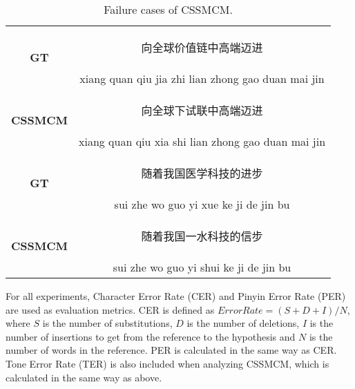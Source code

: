 \documentclass[sigconf]{acmart}
\begin{document}
\begin{table}[htp]
\small
\centering
\caption {Failure cases of CSSMCM.}
\label{table:text_failure}
\begin{tabular}{c | c }

\hline
\multirow{2}{*}{\textbf{GT}}     & \begin{CJK*}{UTF8}{gbsn}向全球价值链中高端迈进\end{CJK*} \\
                & xiang quan qiu jia zhi lian zhong gao duan mai jin    \\ \hline
\multirow{2}{*}{\textbf{CSSMCM}} & \begin{CJK*}{UTF8}{gbsn}向全球下试联中高端迈进\end{CJK*} \\
                & xiang quan qiu xia shi lian zhong gao duan mai jin   \\ \hline \hline
  
\multirow{2}{*}{\textbf{GT}}     & \begin{CJK*}{UTF8}{gbsn}随着我国医学科技的进步\end{CJK*}  \\
                & sui zhe wo guo yi xue ke ji de jin bu   \\ 
                \hline
\multirow{2}{*}{\textbf{CSSMCM}} & \begin{CJK*}{UTF8}{gbsn}随着我国一水科技的信步\end{CJK*}  \\
                & sui zhe wo guo yi shui ke ji de jin bu   \\ 
\hline

\end{tabular}
\end{table}

For all experiments, Character Error Rate (CER) and Pinyin Error Rate (PER) are used as evaluation metrics. CER is defined as $ErrorRate = (S + D + I) / N$, where $S$ is the number of substitutions, $D$ is the number of deletions, $I$ is the number of insertions to get from the reference to the hypothesis and $N$ is the number of words in the reference. PER is calculated in the same way as CER. Tone Error Rate (TER) is also included when analyzing CSSMCM, which is calculated in the same way as above.
\end{document}
